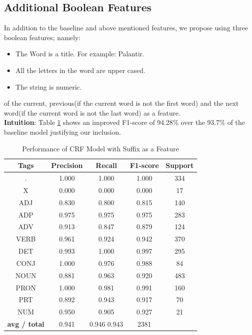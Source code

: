 \documentclass[12pt]{article}
\begin{document}
\subsection{Additional Boolean Features}
In addition to the baseline and above mentioned features, we propose using three boolean features; namely:
\begin{itemize}
    \item The Word is a title. For example: Palantir.
    \item All the letters in the word are upper cased.
    \item The string is numeric.
    
\end{itemize}
of the current, previous(if the current word is not the first word) and the next word(if the current word is not the last word) as a feature.\\
\textbf{Intuition}:
Table \ref{tab:table6} shows an improved F1-score of 94.28\% over the 93.7\% of the baseline model justifying our inclusion.
\begin{table}[h!]
\begin{center}
    \caption{Performance of CRF Model with Suffix as a Feature}
    \label{tab:table6}
\begin{tabular}{ c c c c c}
 \textbf{Tags}& \textbf{Precision} & \textbf{Recall} & \textbf{F1-score} & \textbf{Support} \\ 
 \hline

          .   &   1.000  &   1.000  &   1.000  &     334\\ 
          X   &   0.000  &   0.000  &   0.000  &      17\\ 
        ADJ   &   0.830  &   0.800  &   0.815  &     140\\ 
        ADP   &   0.975  &   0.975  &   0.975  &     283\\ 
        ADV   &   0.913  &   0.847  &   0.879  &     124\\ 
       VERB   &   0.961  &   0.924  &   0.942  &     370\\ 
        DET   &   0.993  &   1.000  &   0.997  &     295\\ 
       CONJ   &   1.000  &   0.976  &   0.988  &      84\\ 
       NOUN  &    0.881  &   0.963  &   0.920  &     483\\ 
       PRON  &    1.000  &   0.981  &   0.991  &     160\\ 
        PRT  &    0.892  &   0.943  &   0.917  &      70\\ 
        NUM  &    0.950  &   0.905  &   0.927  &      21\\ 
\hline
\textbf{avg / total} &    0.941  &   0.946     0.943   &   2381

\end{tabular}
\end{center}
\end{table}
\end{document}
